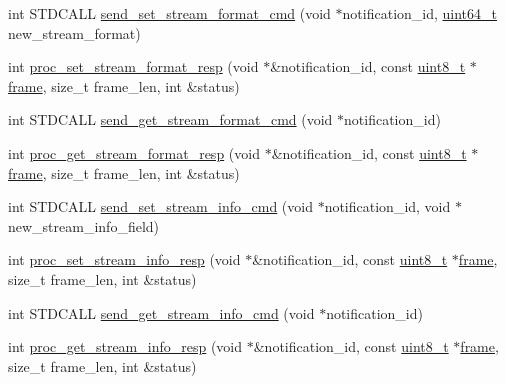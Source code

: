 \begin{DoxyCompactItemize}
\item 
int S\+T\+D\+C\+A\+LL \hyperlink{classavdecc__lib_1_1stream__input__descriptor__imp_ad5c08ba242703c9d0f6cab2b08d6aad6}{send\+\_\+set\+\_\+stream\+\_\+format\+\_\+cmd} (void $\ast$notification\+\_\+id, \hyperlink{parse_8c_aec6fcb673ff035718c238c8c9d544c47}{uint64\+\_\+t} new\+\_\+stream\+\_\+format)
\item 
int \hyperlink{classavdecc__lib_1_1stream__input__descriptor__imp_af496c7db35b10428eb3587c7f460297a}{proc\+\_\+set\+\_\+stream\+\_\+format\+\_\+resp} (void $\ast$\&notification\+\_\+id, const \hyperlink{stdint_8h_aba7bc1797add20fe3efdf37ced1182c5}{uint8\+\_\+t} $\ast$\hyperlink{gst__avb__playbin_8c_ac8e710e0b5e994c0545d75d69868c6f0}{frame}, size\+\_\+t frame\+\_\+len, int \&status)
\item 
int S\+T\+D\+C\+A\+LL \hyperlink{classavdecc__lib_1_1stream__input__descriptor__imp_a55d62cc35400a8d57aefbcfbea84acb9}{send\+\_\+get\+\_\+stream\+\_\+format\+\_\+cmd} (void $\ast$notification\+\_\+id)
\item 
int \hyperlink{classavdecc__lib_1_1stream__input__descriptor__imp_a14f4051747c7470766410b64a8dfef84}{proc\+\_\+get\+\_\+stream\+\_\+format\+\_\+resp} (void $\ast$\&notification\+\_\+id, const \hyperlink{stdint_8h_aba7bc1797add20fe3efdf37ced1182c5}{uint8\+\_\+t} $\ast$\hyperlink{gst__avb__playbin_8c_ac8e710e0b5e994c0545d75d69868c6f0}{frame}, size\+\_\+t frame\+\_\+len, int \&status)
\item 
int S\+T\+D\+C\+A\+LL \hyperlink{classavdecc__lib_1_1stream__input__descriptor__imp_ac48b51177fab090d7ebd520dcd91525d}{send\+\_\+set\+\_\+stream\+\_\+info\+\_\+cmd} (void $\ast$notification\+\_\+id, void $\ast$new\+\_\+stream\+\_\+info\+\_\+field)
\item 
int \hyperlink{classavdecc__lib_1_1stream__input__descriptor__imp_a37df54e12713796100b4751fa479395d}{proc\+\_\+set\+\_\+stream\+\_\+info\+\_\+resp} (void $\ast$\&notification\+\_\+id, const \hyperlink{stdint_8h_aba7bc1797add20fe3efdf37ced1182c5}{uint8\+\_\+t} $\ast$\hyperlink{gst__avb__playbin_8c_ac8e710e0b5e994c0545d75d69868c6f0}{frame}, size\+\_\+t frame\+\_\+len, int \&status)
\item 
int S\+T\+D\+C\+A\+LL \hyperlink{classavdecc__lib_1_1stream__input__descriptor__imp_a28e797d4aac97c6e6c31e79ce8a1a4e6}{send\+\_\+get\+\_\+stream\+\_\+info\+\_\+cmd} (void $\ast$notification\+\_\+id)
\item 
int \hyperlink{classavdecc__lib_1_1stream__input__descriptor__imp_a7295ef0aaf778e1d94aa5b8150104a3e}{proc\+\_\+get\+\_\+stream\+\_\+info\+\_\+resp} (void $\ast$\&notification\+\_\+id, const \hyperlink{stdint_8h_aba7bc1797add20fe3efdf37ced1182c5}{uint8\+\_\+t} $\ast$\hyperlink{gst__avb__playbin_8c_ac8e710e0b5e994c0545d75d69868c6f0}{frame}, size\+\_\+t frame\+\_\+len, int \&status)

\end{DoxyCompactItemize}
